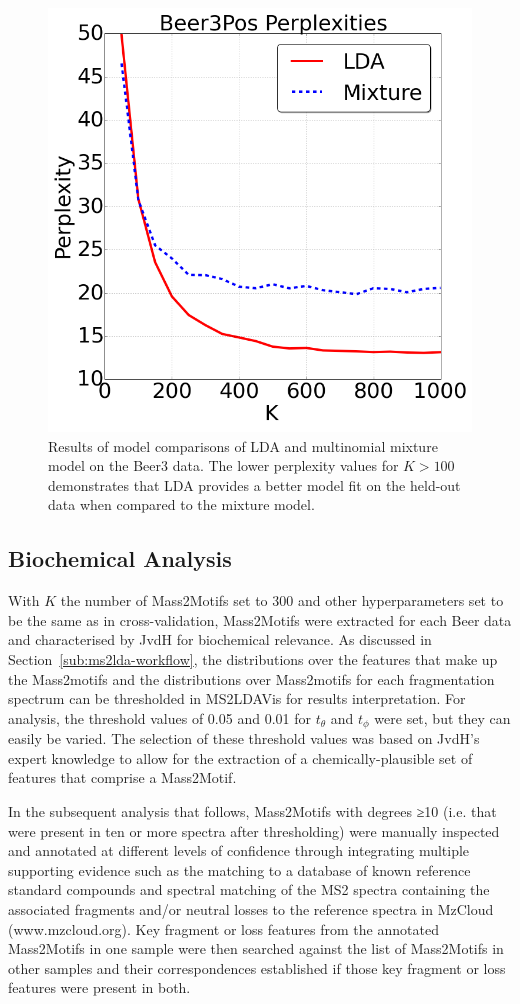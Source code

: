 \begin{figure}[!htbp]
\centering\includegraphics[width=0.5\linewidth]{07-lda/figures/perplexity.png}
\centering\caption{Results of model comparisons of LDA and multinomial mixture model on the Beer3 data. The lower perplexity values for $K>100$ demonstrates that LDA provides a better model fit on the held-out data when compared to the mixture model.\label{fig:m2lda-perplexity}}
\end{figure}

\subsection{Biochemical Analysis \label{sub:lda-biological-findings}}

With $K$ the number of Mass2Motifs set to 300 and other hyperparameters set to be the same as in cross-validation, Mass2Motifs were extracted for each Beer data and characterised by JvdH for biochemical relevance. As discussed in Section~\ref{sub:ms2lda-workflow}, the distributions over the features that make up the Mass2motifs and the distributions over Mass2motifs for each fragmentation spectrum can be thresholded in MS2LDAVis for results interpretation. For analysis, the threshold values of 0.05 and 0.01 for $t_{\theta}$ and $t_{\phi}$ were set, but they can easily be varied. The selection of these threshold values was based on JvdH's expert knowledge to allow for the extraction of a chemically-plausible set of features that comprise a Mass2Motif.

In the subsequent analysis that follows, Mass2Motifs with degrees ≥10 (i.e. that were present in ten or more spectra after thresholding) were manually inspected and annotated at different levels of confidence through integrating multiple supporting evidence such as the matching to a database of known reference standard compounds and spectral matching of the MS2 spectra containing the associated fragments and/or neutral losses to the reference spectra in MzCloud (www.mzcloud.org). Key fragment or loss features from the annotated Mass2Motifs in one sample were then searched against the list of Mass2Motifs in other samples and their correspondences established if those key fragment or loss features were present in both. 

